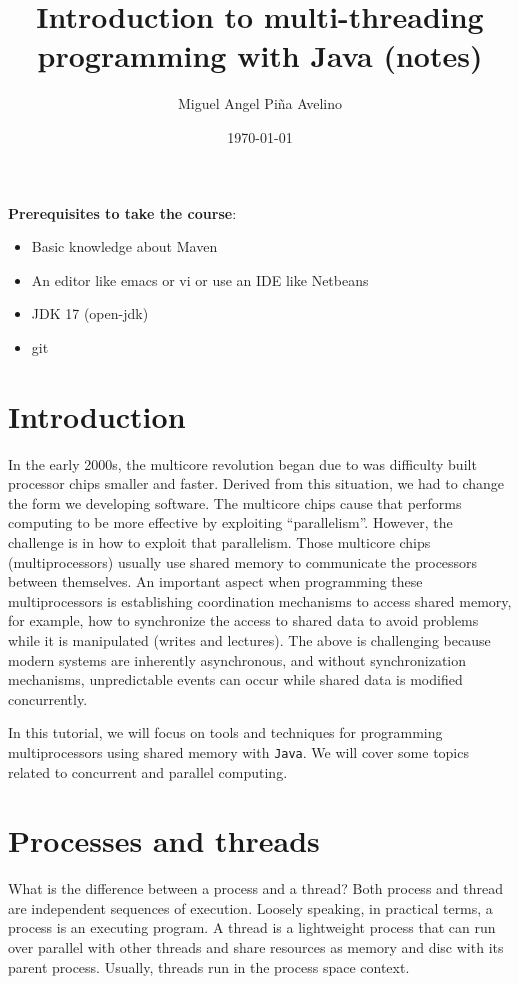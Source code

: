 \documentclass{latex/classes/myarticle}
\author{Miguel Angel Piña Avelino}
\date{\today}
\title{Introduction to multi-threading programming with Java (notes)}
\begin{document}
\maketitle
\textbf{Prerequisites to take the course}:
\begin{itemize}
\item Basic knowledge about Maven
\item An editor like emacs or vi or use an IDE like Netbeans
\item JDK 17 (open-jdk)
\item git
\end{itemize}

\section{Introduction}
\label{sec:org7917e16}

In the early 2000s, the multicore revolution began due to was difficulty
built processor chips smaller and faster. Derived from this situation, we had
to change the form we developing software. The multicore chips cause that
performs computing to be more effective by exploiting
``parallelism''. However, the challenge is in how to exploit that
parallelism. Those multicore chips (multiprocessors) usually use shared
memory to communicate the processors between themselves. An important aspect
when programming these multiprocessors is establishing coordination
mechanisms to access shared memory, for example, how to synchronize the
access to shared data to avoid problems while it is manipulated (writes and
lectures). The above is challenging because modern systems are inherently
asynchronous, and without synchronization mechanisms, unpredictable events
can occur while shared data is modified concurrently.

In this tutorial, we will focus on tools and techniques for programming
multiprocessors using shared memory with \texttt{Java}. We will cover some topics
related to concurrent and parallel computing.


\section{Processes and threads}
\label{sec:org147bb4a}

What is the difference between a process and a thread? Both process and
thread are independent sequences of execution. Loosely speaking, in practical
terms, a process is an executing program. A thread is a lightweight process
that can run over parallel with other threads and share resources as memory
and disc with its parent process. Usually, threads run in the process space
context.
\end{document}
